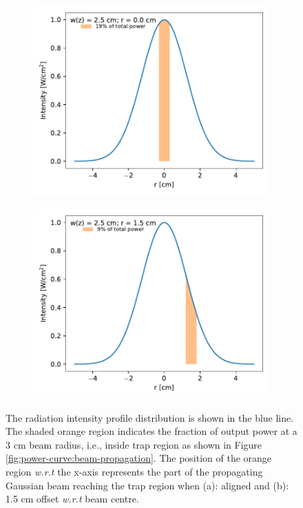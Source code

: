 \begin{figure}[!htb]
    \centering
    \begin{subfigure}{0.49\textwidth}
        \centering
        \includegraphics[width=1\textwidth]{figures/measurements/power-curve-453GHz/beam_propagation_power_curve_w0-2.50_offset-0.00_dia-0.60.pdf}
        \caption{}
        \label{fig:power-curve:beam-propagation-power:at0}
    \end{subfigure}
    \hfill
    \begin{subfigure}{0.49\textwidth}
        \centering
        \includegraphics[width=1\textwidth]{figures/measurements/power-curve-453GHz/beam_propagation_power_curve_w0-2.50_offset-1.50_dia-0.60.pdf}
        \caption{}
        \label{fig:power-curve:beam-propagation-power:offset}
    \end{subfigure}
    \caption{The radiation intensity profile distribution is shown in the blue line. The shaded orange region indicates the fraction of output power at a 3 cm beam radius, i.e., inside trap region as shown in Figure \ref{fig:power-curve:beam-propagation}. The position of the orange region \emph{w.r.t} the x-axis represents the part of the propagating Gaussian beam reaching the trap region when (a): aligned and (b): 1.5 cm offset \emph{w.r.t} beam centre.}
    \label{fig:power-curve:beam-propagation-power}
\end{figure}
